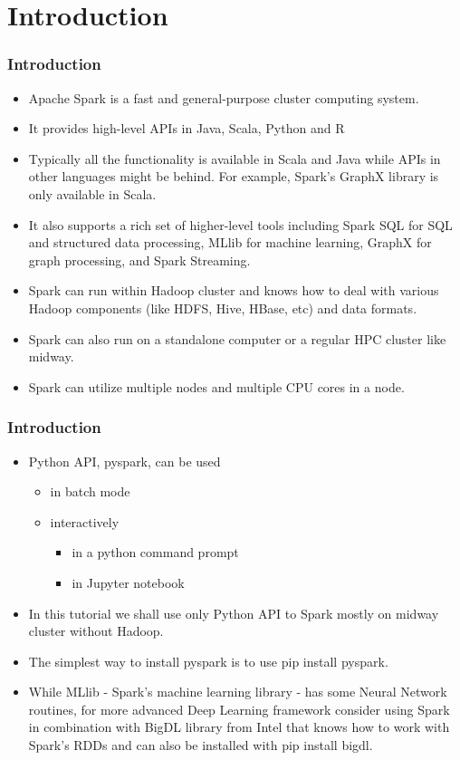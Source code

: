 \section{Introduction}

\begin{frame}[fragile]
  \frametitle{Introduction}
  
\begin{itemize}
\item Apache Spark is a fast and general-purpose cluster computing system. 
\item It provides high-level APIs in Java, Scala, Python and R
\item Typically all the functionality is available in Scala and Java while APIs 
  in other languages might be behind. For example, Spark's GraphX library is only available in Scala.
\item It also supports a rich set of higher-level tools including Spark SQL for SQL 
  and structured data processing, MLlib for machine learning, GraphX for graph processing, and Spark Streaming.
\item Spark can run within Hadoop cluster and knows how to deal with various 
  Hadoop components (like HDFS, Hive, HBase, etc) and data formats.
\item Spark can also run on a standalone computer or a regular HPC cluster like midway.
\item Spark can utilize multiple nodes and multiple CPU cores in a node.
\end{itemize}

\end{frame}

\begin{frame}[fragile]
  \frametitle{Introduction}
  
  \begin{itemize}
  \item Python API, {\color{mycolordef}pyspark}, can be used 
    \begin{itemize} 
    \item in batch mode 
    \item interactively 
      \begin{itemize}
      \item in a python command prompt
      \item in Jupyter notebook
      \end{itemize}
    \end{itemize}
  \item In this tutorial we shall use only Python API to Spark mostly on midway cluster without Hadoop.
  \item The simplest way to install pyspark is to use {\color{mycolorcli}pip install pyspark}.
  \item While {\color{mycolordef}MLlib} - Spark's machine learning library -  has some Neural Network routines, for more advanced Deep Learning framework 
    consider using Spark in combination with {\color{mycolordef}BigDL} library from Intel that knows how to work with Spark's RDDs and can also be installed with
    {\color{mycolorcli}pip install bigdl}.
  \end{itemize}  
\end{frame}



